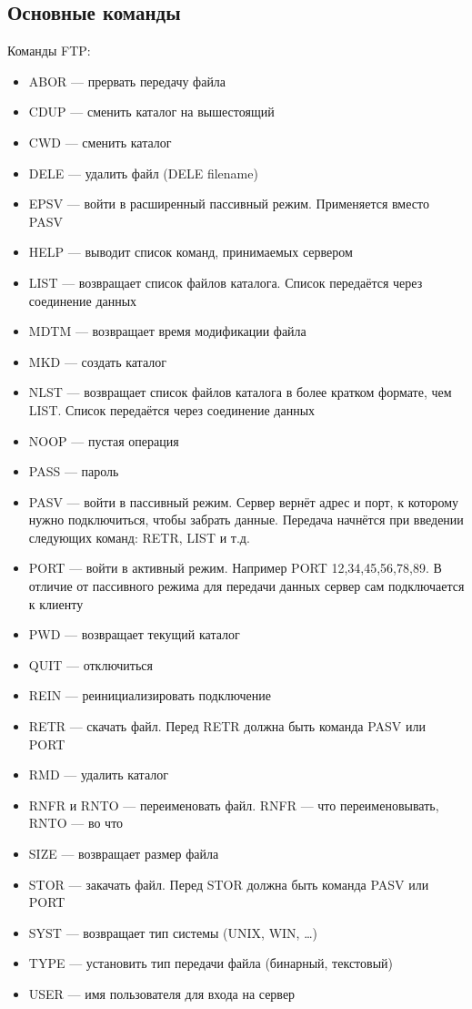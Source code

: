 \subsection{Основные команды}
Команды FTP:
\begin{itemize}
\item ABOR — прервать передачу файла
\item CDUP — сменить каталог на вышестоящий
\item CWD — сменить каталог
\item DELE — удалить файл (DELE filename)
\item EPSV — войти в расширенный пассивный режим. Применяется вместо PASV
\item HELP — выводит список команд, принимаемых сервером
\item LIST — возвращает список файлов каталога. Список передаётся через соединение данных
\item MDTM — возвращает время модификации файла
\item MKD — создать каталог
\item NLST — возвращает список файлов каталога в более кратком формате, чем LIST. Список передаётся через соединение данных
\item NOOP — пустая операция
\item PASS — пароль
\item PASV — войти в пассивный режим. Сервер вернёт адрес и порт, к которому нужно подключиться, чтобы забрать данные. Передача начнётся при введении следующих команд: RETR, LIST и т.д.
\item PORT — войти в активный режим. Например PORT 12,34,45,56,78,89. В отличие от пассивного режима для передачи данных сервер сам подключается к клиенту
\item PWD — возвращает текущий каталог
\item QUIT — отключиться
\item REIN — реинициализировать подключение
\item RETR — скачать файл. Перед RETR должна быть команда PASV или PORT
\item RMD — удалить каталог
\item RNFR и RNTO — переименовать файл. RNFR — что переименовывать, RNTO — во что
\item SIZE — возвращает размер файла
\item STOR — закачать файл. Перед STOR должна быть команда PASV или PORT
\item SYST — возвращает тип системы (UNIX, WIN, …)
\item TYPE — установить тип передачи файла (бинарный, текстовый)
\item USER — имя пользователя для входа на сервер
\end{itemize}

